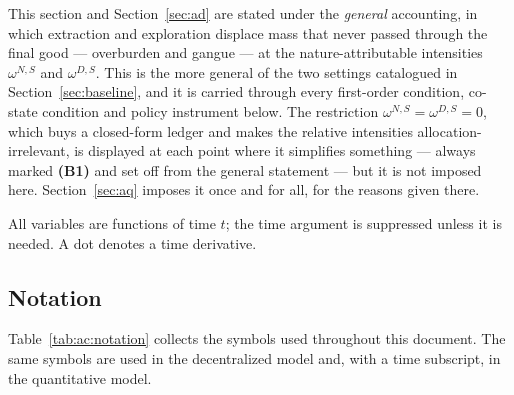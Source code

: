  This section and Section~\ref{sec:ad} are stated under the \emph{general} accounting, in which extraction and exploration displace mass that never passed through the final good --- overburden and gangue --- at the nature-attributable intensities $\omega^{N,S}$ and $\omega^{D,S}$. This is the more general of the two settings catalogued in Section~\ref{sec:baseline}, and it is carried through every first-order condition, co-state condition and policy instrument below. The restriction $\omega^{N,S}=\omega^{D,S}=0$, which buys a closed-form ledger and makes the relative intensities allocation-irrelevant, is displayed at each point where it simplifies something --- always marked \textbf{(B1)} and set off from the general statement --- but it is not imposed here. Section~\ref{sec:aq} imposes it once and for all, for the reasons given there.

All variables are functions of time $t$; the time argument is suppressed unless it is needed. A dot denotes a time derivative.

\subsection{Notation}
\label{subsec:ac:notation}

Table~\ref{tab:ac:notation} collects the symbols used throughout this document. The same symbols are used in the decentralized model and, with a time subscript, in the quantitative model.

